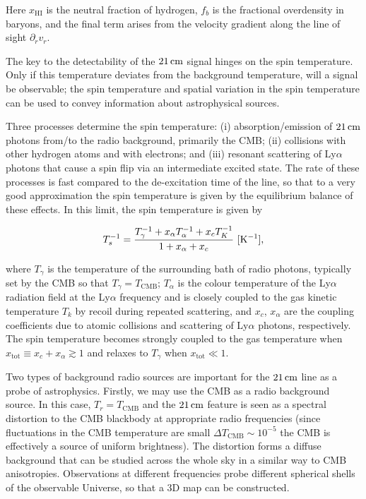 \documentclass[a4paper,11pt]{article}
\begin{document}
{\noindent}Here $x_\mathrm{HI}$ is the neutral fraction of hydrogen, $f_b$ is the fractional overdensity in baryons,
and the final term arises from the velocity gradient along the line of sight $\partial_rv_r$.

{\noindent}The key to the detectability of the $21\,{\rm cm}$ signal hinges on the spin temperature. Only if this temperature deviates from the background temperature, will a signal be observable; the spin temperature and spatial variation in the spin temperature can be used to convey information about astrophysical sources.

{\noindent}Three processes determine the spin temperature: (i) absorption/emission of $21\,{\rm cm}$ photons from/to the radio background, primarily the CMB; (ii) collisions with other hydrogen atoms and with electrons; and (iii) resonant scattering of Ly$\alpha$ photons that cause a spin flip via an intermediate excited state. The rate of these processes is fast compared to the de-excitation time of the line, so that to a very good approximation the spin temperature is given by the equilibrium balance of these effects. In this limit,
the spin temperature is given by

\begin{align*}
    T_s^{-1} = \frac{T_\gamma^{-1} + x_\alpha T_\alpha^{-1} + x_cT_K^{-1}}{1+x_\alpha+x_c} ~ [{\rm K^{-1}}],
\end{align*}

{\noindent}where $T_\gamma$ is the temperature of the surrounding bath of radio photons, typically set by the CMB so that $T_\gamma=T_\mathrm{CMB}$; $T_\alpha$ is the colour temperature of the Ly$\alpha$ radiation field at the Ly$\alpha$ frequency and is closely coupled to the gas kinetic temperature $T_k$ by recoil during repeated scattering, and $x_c$, $x_\alpha$ are the coupling coefficients due to atomic collisions and scattering of Ly$\alpha$ photons, respectively. The spin temperature becomes strongly coupled to the gas temperature when $x_\mathrm{tot}\equiv x_c+x_\alpha\gtrsim1$ and relaxes to $T_\gamma$ when $x_\mathrm{tot}\ll1$.

{\noindent}Two types of background radio sources are important for the $21\,{\rm cm}$ line as a probe of astrophysics. Firstly, we may use the CMB as a radio background source. In this case, $T_r = T_\mathrm{CMB}$ and the $21\,{\rm cm}$ feature is seen as a spectral distortion to the CMB blackbody at appropriate radio frequencies (since fluctuations in the CMB temperature are small $\Delta T_\mathrm{CMB}\sim10^{-5}$ the CMB is effectively a source of uniform brightness). The distortion forms a diffuse background that can be studied across the whole sky in a similar way to CMB anisotropies. Observations at different frequencies probe different spherical shells of the observable Universe, so that a 3D map can be constructed.
\end{document}
